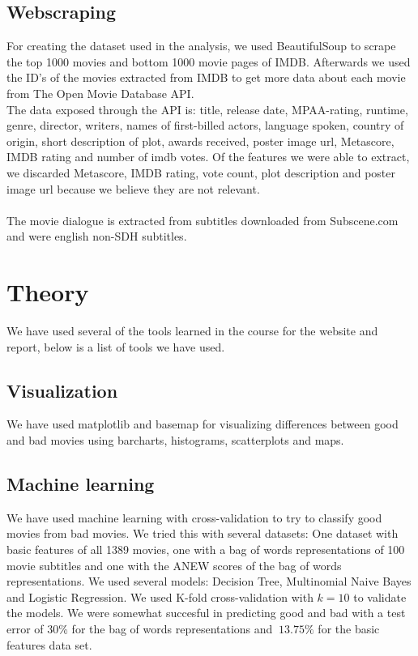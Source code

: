\documentclass{acm_proc_article-sp}
\begin{document}
\subsection{Webscraping}
For creating the dataset used in the analysis, we used BeautifulSoup\cite{BS4} to scrape the top 1000 movies and bottom 1000 movie pages of IMDB\cite{IMDB}. Afterwards we used the ID's of the movies extracted from IMDB to get more data about each movie from The Open Movie Database API\cite{OMDB}.\\ The data exposed through the API is: title, release date, MPAA-rating, runtime, genre, director, writers, names of first-billed actors, language spoken, country of origin, short description of plot, awards received, poster image url, Metascore, IMDB rating and number of imdb votes.
Of the features we were able to extract, we discarded Metascore, IMDB rating, vote count, plot description and poster image url because we believe they are not relevant.\\\\
The movie dialogue is extracted from subtitles downloaded from Subscene.com\cite{subscene} and were english non-SDH subtitles.

\section{Theory}
We have used several of the tools learned in the course for the website and report, below is a list of tools we have used.
\subsection{Visualization}
We have used matplotlib and basemap for visualizing differences between good and bad movies using barcharts, histograms, scatterplots and maps.
\subsection{Machine learning}
We have used machine learning with cross-validation to try to classify good movies from bad movies. We tried this with several datasets: One dataset with basic features of all 1389 movies, one with a bag of words representations of 100 movie subtitles and one with the ANEW scores of the bag of words representations. We used several models: Decision Tree, Multinomial Naive Bayes and Logistic Regression. We used K-fold cross-validation with $k=10$ to validate the models. We were somewhat succesful in predicting good and bad with a test error of 30\% for the bag of words representations and $~13.75\%$ for the basic features data set.
\end{document}
